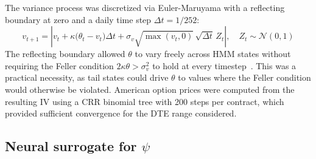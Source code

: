 The variance process was discretized via Euler-Maruyama with a reflecting boundary at zero and a daily time step $\Delta t = 1/252$:
\begin{equation}\label{eq:euler}
    v_{t+1} = \left| v_t + \kappa\bigl(\theta_t - v_t\bigr)\Delta t + \sigma_v \sqrt{\max(v_t, 0)}\,\sqrt{\Delta t}\, Z_t \right|, \quad Z_t \sim \mathcal{N}(0, 1)
\end{equation}
The reflecting boundary allowed $\theta$ to vary freely across HMM states without requiring the Feller condition $2\kappa\theta > \sigma_v^2$ to hold at every timestep~\cite{andersen2008}. This was a practical necessity, as tail states could drive $\theta$ to values where the Feller condition would otherwise be violated. American option prices were computed from the resulting IV using a CRR binomial tree with 200 steps per contract, which provided sufficient convergence for the DTE range considered.

\subsection{Neural surrogate for $\psi$}\label{sec:psi_nn}

